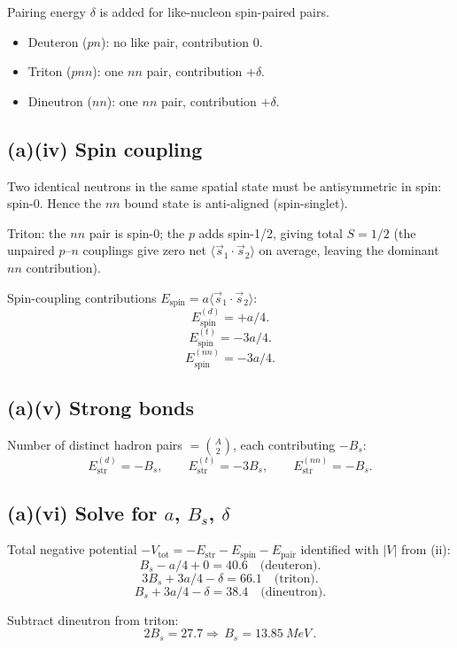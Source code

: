 \documentclass[11pt]{article}
\begin{document}
Pairing energy $\delta$ is added for like-nucleon spin-paired pairs.
\begin{itemize}
  \item Deuteron ($pn$): no like pair, contribution $0$.
  \item Triton ($pnn$): one $nn$ pair, contribution $+\delta$.
  \item Dineutron ($nn$): one $nn$ pair, contribution $+\delta$.
\end{itemize}

\subsection*{(a)(iv) Spin coupling}

Two identical neutrons in the same spatial state must be antisymmetric in spin: spin-0. Hence the $nn$ bound state is anti-aligned (spin-singlet).

Triton: the $nn$ pair is spin-0; the $p$ adds spin-1/2, giving total $S=1/2$ (the unpaired $p$--$n$ couplings give zero net $\langle\vec s_1\cdot\vec s_2\rangle$ on average, leaving the dominant $nn$ contribution).

Spin-coupling contributions $E_\text{spin}=a\langle\vec s_1\cdot\vec s_2\rangle$:
\[ E_\text{spin}^{(d)} = +a/4. \]
\[ E_\text{spin}^{(t)} = -3a/4. \]
\[ E_\text{spin}^{(nn)} = -3a/4. \]

\subsection*{(a)(v) Strong bonds}

Number of distinct hadron pairs $=\binom{A}{2}$, each contributing $-B_s$:
\[ E_\text{str}^{(d)} = -B_s,\qquad E_\text{str}^{(t)} = -3B_s,\qquad E_\text{str}^{(nn)} = -B_s. \]

\subsection*{(a)(vi) Solve for $a$, $B_s$, $\delta$}

Total negative potential $-V_\text{tot} = -E_\text{str}-E_\text{spin}-E_\text{pair}$ identified with $|V|$ from (ii):
\[ B_s - a/4 + 0 = 40.6 \quad\text{(deuteron)}. \]
\[ 3B_s + 3a/4 - \delta = 66.1 \quad\text{(triton)}. \]
\[ B_s + 3a/4 - \delta = 38.4 \quad\text{(dineutron)}. \]

Subtract dineutron from triton:
\[ 2B_s = 27.7 \Longrightarrow \boxed{\,B_s = \SI{13.85}{MeV}\,}. \]
\end{document}
